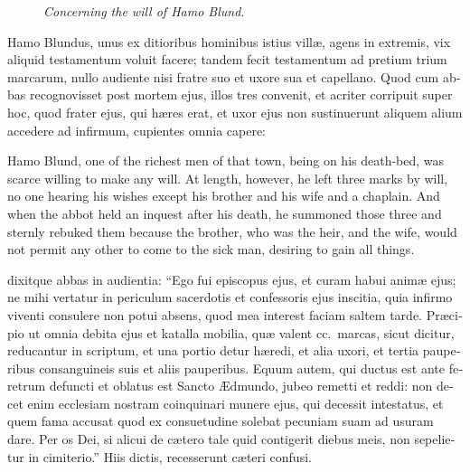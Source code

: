 \documentclass[10pt]{book}
\newcommand{\blockhead}[4][]{
\begin{figure}
\centering
\vspace{#4}
\parbox{2.75cm}{\begin{center}\footnotesize \color{BrickRed} \emph{#2}\\ #1 \end{center}}
\end{figure}
}
\begin{document}
\begin{paracol}{2}
\switchcolumn*

\begin{otherlanguage}{latin}
\blockhead{Concerning the will of Hamo Blund.}{3}{-.55cm} 
Hamo Blundus, unus ex ditioribus hominibus istius vill\ae{}, agens in extremis, vix aliquid testamentum voluit facere; tandem fecit testamentum ad pretium trium marcarum, nullo audiente nisi fratre suo et uxore sua et capellano. Quod cum abbas recognovisset post mortem ejus, illos tres convenit, et acriter corripuit super hoc, quod frater ejus, qui h\ae{}res erat, et uxor ejus non sustinuerunt aliquem alium accedere ad infirmum, cupientes omnia capere:

\end{otherlanguage}

\switchcolumn

Hamo Blund, one of the richest men of that town, being on his death-bed, was scarce willing to make any will. At length, however, he left three marks by will, no one hearing his wishes except his brother and his wife and a chaplain. And when the abbot held an inquest after his death, he summoned those three and sternly rebuked them because the brother, who was the heir, and the wife, would not permit any other to come to the sick man, desiring to gain all things.

\switchcolumn*

\begin{otherlanguage}{latin}
dixitque abbas in audientia: ``Ego fui episcopus ejus, et curam habui anim\ae{} ejus; ne mihi vertatur in periculum sacerdotis et confessoris ejus inscitia, quia infirmo viventi consulere non potui absens, quod mea interest faciam saltem tarde. Pr\ae{}cipio ut omnia debita ejus et katalla mobilia, qu\ae{} valent cc.\ marcas, sicut dicitur, reducantur in scriptum, et una portio detur h\ae{}redi, et alia uxori, et tertia pauperibus consanguineis suis et aliis pauperibus. Equum autem, qui ductus est ante feretrum defuncti et oblatus est Sancto \AE{}dmundo, jubeo remetti et reddi: non decet enim ecclesiam nostram coinquinari munere ejus, qui decessit intestatus, et quem fama accusat quod ex consuetudine solebat pecuniam suam ad usuram dare. Per os Dei, si alicui de c\ae{}tero tale quid contigerit diebus meis, non sepelietur in cimiterio.'' Hiis dictis, recesserunt c\ae{}teri confusi.
\end{otherlanguage}

\switchcolumn


\end{paracol}
\end{document}
